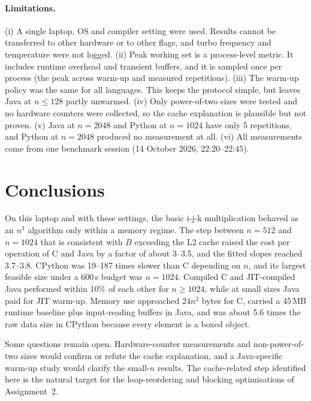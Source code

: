 \documentclass[11pt,a4paper]{article}
\begin{document}
\paragraph{Limitations.}
(i) A single laptop, OS and compiler setting were used. Results cannot be transferred to other hardware or to other
flags, and turbo frequency and temperature were not logged.
(ii) Peak working set is a process-level metric. It includes runtime overhead and transient buffers,
and it is sampled once per process (the peak across warm-up and measured repetitions).
(iii) The warm-up policy was the same for all languages. This keeps the protocol simple, but leaves Java at
$n \le 128$ partly unwarmed.
(iv) Only power-of-two sizes were tested and no hardware counters were collected, so the
cache explanation is plausible but not proven.
(v) Java at $n = 2048$ and Python at $n = 1024$ have only 5 repetitions, and Python at $n = 2048$ produced no
measurement at all.
(vi) All measurements come from one benchmark session (14 October 2026, 22:20--22:45).

\section{Conclusions}
On this laptop and with these settings, the basic i-j-k multiplication behaved as an $n^3$
algorithm only within a memory regime. The step between $n = 512$ and $n = 1024$ that is consistent
with $B$ exceeding the L2 cache raised the cost per operation of C and Java by a factor of about 3--3.5, and
the fitted slopes reached 3.7--3.8. CPython was 19--187 times slower than C depending on $n$, and its
largest feasible size under a 600\,s budget was $n = 1024$. Compiled C and JIT-compiled Java performed
within 10\% of each other for $n \ge 1024$, while at small sizes Java paid for JIT warm-up. Memory use
approached $24n^2$ bytes for C, carried a 45\,MB runtime baseline plus input-reading buffers in Java,
and was about 5.6 times the raw data size in CPython because every element is a boxed object.

Some questions remain open. Hardware-counter measurements and non-power-of-two sizes would confirm or
refute the cache explanation, and a Java-specific warm-up study would clarify the small-$n$ results.
The cache-related step identified here is the natural target for the loop-reordering and blocking
optimisations of Assignment~2.

\end{document}
